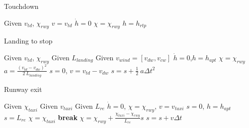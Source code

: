 \documentclass[11pt]{book}              %
\newcommand{\algorithmicbreak}{\textbf{break}}
\newcommand{\Break}{\State \algorithmicbreak}
\newcommand{\algorithmicand}{\textbf{and }}
\renewcommand{\And}{\algorithmicand}
\newcommand{\half}{\frac{1}{2}}
\begin{document}
\begin{algorithm}[H]
\caption{Touchdown}\label{alg:PropAlgo15}
\begin{algorithmic}[1]
\State Given $v_{td}$, $\chi_{rwy}$ 
\State $v = v_{td}$
\State $\dot{h} = 0$
\State $\chi = \chi_{rwy}$
\State $h=h_{rtp}$
\end{algorithmic}
\end{algorithm}
\begin{algorithm}[H]
\caption{Landing to stop}\label{alg:PropAlgo16}
\begin{algorithmic}[1]
\State Given $v_{td}$, $\chi_{rwy}$ 
\State Given $L_{landing}$ 
\State Given $v_{wind}=[v_{dw},v_{cw}]$ 
\State $\dot{h} = 0$,$h=h_{apt}$
\State $\chi = \chi_{rwy}$
\State $a = \frac{(v_{td}-v_{dw})^2}{2\:L_{landing}}$
\State $s=0$, $v = v_{td}-v_{dw}$
\State $s = s + \half\: a \Delta t^2$
\EndWhile
\end{algorithmic}
\end{algorithm}
\begin{algorithm}[H]
\caption{Runway exit}\label{alg:PropAlgo17}
\begin{algorithmic}[1]
\State Given $\chi_{taxi}$ 
\State Given $v_{taxi}$ 
\State Given $L_{re}$ 
\State $\dot{h} = 0$, $\chi = \chi_{rwy}$, $v = v_{taxi}$ 
\State $s=0$, $h=h_{apt}$
\While {$\chi \neq \chi_{taxi}$ \And $ s< L_{re}$}
\State  $s = L_{re}$
\State $\chi = \chi_{taxi}$
\Break
\EndIf
\State $\chi = \chi_{rwy}+ \frac{\chi_{taxi}-\chi_{rwy}}{L_{re}}s$
\State $s = s+v\Delta t$
\EndWhile
\end{algorithmic}
\end{algorithm}
\end{document}
